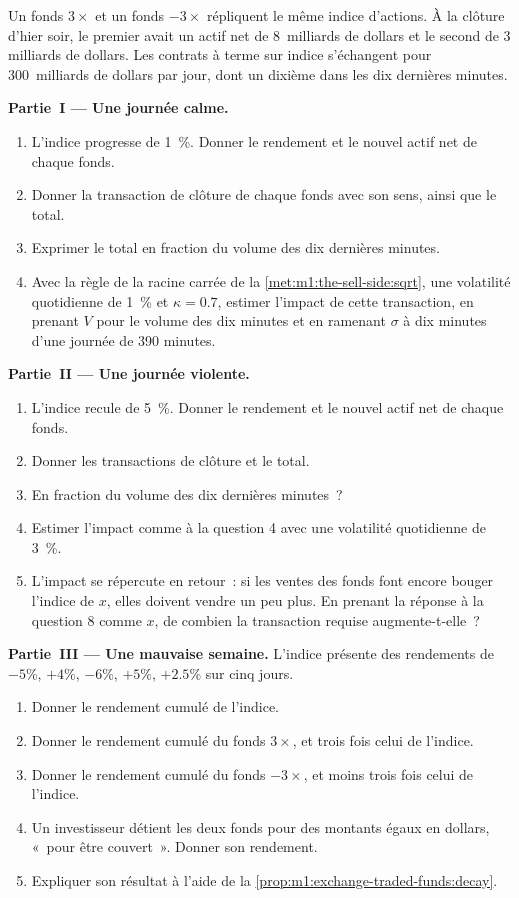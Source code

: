 \begin{problem}\label{pb:m1:exchange-traded-funds:1}
Un fonds $3\times$ et un fonds $-3\times$ répliquent le même indice d'actions. À la clôture
d'hier soir, le premier avait un actif net de 8~milliards de dollars et le second de 3
milliards de dollars. Les contrats à terme sur indice s'échangent pour 300~milliards de dollars par jour, dont un dixième dans les
dix dernières minutes.

\medskip\noindent\textbf{Partie~I --- Une journée calme.}
\begin{enumerate}
\item L'indice progresse de 1~\%. Donner le rendement et le nouvel actif net de chaque fonds.
\item Donner la transaction de clôture de chaque fonds avec son sens, ainsi que le total.
\item Exprimer le total en fraction du volume des dix dernières minutes.
\item Avec la règle de la racine carrée de la \cref{met:m1:the-sell-side:sqrt}, une volatilité quotidienne
de 1~\% et $\kappa = 0.7$, estimer l'impact de cette transaction,
en prenant $V$ pour le volume des dix minutes et en ramenant $\sigma$ à dix minutes
d'une journée de 390 minutes.
\end{enumerate}

\medskip\noindent\textbf{Partie~II --- Une journée violente.}
\begin{enumerate}[resume]
\item L'indice recule de 5~\%. Donner le rendement et le nouvel actif net de chaque fonds.
\item Donner les transactions de clôture et le total.
\item En fraction du volume des dix dernières minutes~?
\item Estimer l'impact comme à la question 4 avec une volatilité quotidienne de 3~\%.
\item L'impact se répercute en retour~: si les ventes des fonds font encore bouger l'indice
de $x$, elles doivent vendre un peu plus. En prenant la réponse à la question 8 comme $x$,
de combien la transaction requise augmente-t-elle~?
\end{enumerate}

\medskip\noindent\textbf{Partie~III --- Une mauvaise semaine.}
L'indice présente des rendements de $-5\%$, $+4\%$, $-6\%$, $+5\%$, $+2.5\%$ sur cinq jours.
\begin{enumerate}[resume]
\item Donner le rendement cumulé de l'indice.
\item Donner le rendement cumulé du fonds $3\times$, et trois fois celui de
l'indice.
\item Donner le rendement cumulé du fonds $-3\times$, et moins trois fois celui de
l'indice.
\item Un investisseur détient les deux fonds pour des montants égaux en dollars, «~pour être couvert~».
Donner son rendement.
\item Expliquer son résultat à l'aide de la \cref{prop:m1:exchange-traded-funds:decay}.
\end{enumerate}


\end{problem}
